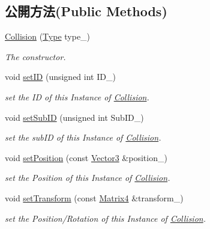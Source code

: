 \subsection*{公開方法(Public Methods)}
\begin{DoxyCompactItemize}
\item 
\hyperlink{class_i_dream_sky_1_1_collision_a46268d910c83ef44fea79b8b72e8de66}{Collision} (\hyperlink{class_i_dream_sky_1_1_collision_a6f78283a27aaf9e6cf2c8a174f0ce816}{Type} type\+\_\+)
\begin{DoxyCompactList}\small\item\em The constructor. \end{DoxyCompactList}\item 
void \hyperlink{class_i_dream_sky_1_1_collision_a499d69586c47a68a1861af057695a30b}{set\+ID} (unsigned int I\+D\+\_\+)
\begin{DoxyCompactList}\small\item\em set the ID of this Instance of \hyperlink{class_i_dream_sky_1_1_collision}{Collision}. \end{DoxyCompactList}\item 
void \hyperlink{class_i_dream_sky_1_1_collision_aeae38467d08b59027dd277ca6923fb2c}{set\+Sub\+ID} (unsigned int Sub\+I\+D\+\_\+)
\begin{DoxyCompactList}\small\item\em set the sub\+ID of this Instance of \hyperlink{class_i_dream_sky_1_1_collision}{Collision}. \end{DoxyCompactList}\item 
void \hyperlink{class_i_dream_sky_1_1_collision_a8b7a7fb7066629e41fdc8c72a009b94f}{set\+Position} (const \hyperlink{class_i_dream_sky_1_1_vector3}{Vector3} \&position\+\_\+)
\begin{DoxyCompactList}\small\item\em set the Position of this Instance of \hyperlink{class_i_dream_sky_1_1_collision}{Collision}. \end{DoxyCompactList}\item 
void \hyperlink{class_i_dream_sky_1_1_collision_ac7719f4d3e922b0234889d58987d5542}{set\+Transform} (const \hyperlink{class_i_dream_sky_1_1_matrix4}{Matrix4} \&transform\+\_\+)
\begin{DoxyCompactList}\small\item\em set the Position/\+Rotation of this Instance of \hyperlink{class_i_dream_sky_1_1_collision}{Collision}. \end{DoxyCompactList}\item 

\end{DoxyCompactItemize}
